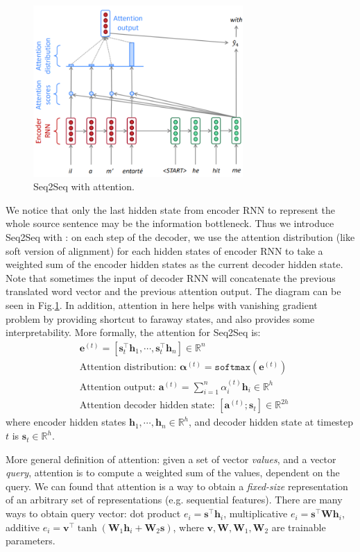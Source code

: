 \begin{figure}[!thp]
	\centerline{\includegraphics[width=8.0cm]{figs/Seq2Seq_attention.png}}
	\caption{Seq2Seq with attention.}
	\label{fig:Seq2Seq_Attention}
\end{figure}

We notice that only the last hidden state from encoder RNN to represent the whole source sentence may be the information bottleneck.
Thus we introduce Seq2Seq with : on each step of the decoder, we use the attention distribution (like soft version of alignment) for each hidden states of encoder RNN to take a weighted sum of the encoder hidden states as the current decoder hidden state.
Note that sometimes the input of decoder RNN will concatenate the previous translated word vector and the previous attention output.
The diagram can be seen in Fig.\ref{fig:Seq2Seq_Attention}.
In addition, attention in here helps with vanishing gradient problem by providing shortcut to faraway states, and also provides some interpretability.
More formally, the attention for Seq2Seq is:
\begin{align}
&\bm{e}^{(t)} = [\bm{s}_t^\top \bm{h}_1, \cdots, \bm{s}_t^\top \bm{h}_n] \in \mathbb{R}^n \nonumber \\
&\text{Attention distribution: } \bm{\alpha}^{(t)} = \texttt{softmax}(\bm{e}^{(t)}) \nonumber \\
&\text{Attention output: } \bm{a}^{(t)} = \sum_{i=1}^n \alpha_i^{(t)} \bm{h}_i \in \mathbb{R}^h \nonumber \\
&\text{Attention decoder hidden state: } [\bm{a}^{(t)}; \bm{s}_t] \in \mathbb{R}^{2h}
\end{align}
where encoder hidden states $\bm{h}_1, \cdots, \bm{h}_n \in \mathbb{R}^h$, and decoder hidden state at timestep $t$ is $\bm{s}_t \in \mathbb{R}^h$.

More general definition of attention: given a set of vector \emph{values}, and a vector \emph{query}, attention is to compute a weighted sum of the values, dependent on the query.
We can found that attention is a way to obtain a \emph{fixed-size} representation of an arbitrary set of representations (e.g. sequential features).
There are many ways to obtain query vector: dot product $e_i = \bm{s}^\top \bm{h}_i$, multiplicative $e_i = \bm{s}^\top \bm{W} \bm{h}_i$, additive $e_i = \bm{v}^\top \tanh (\bm{W}_1 \bm{h}_i + \bm{W}_2 \bm{s})$, where $\bm{v}, \bm{W}, \bm{W}_1, \bm{W}_2$ are trainable parameters.

